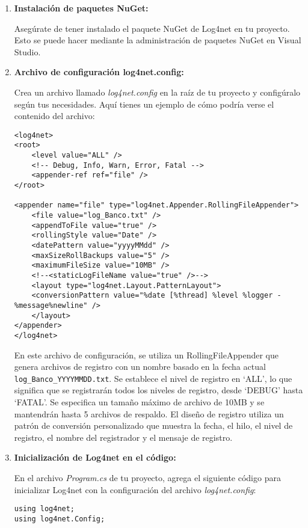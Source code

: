 \documentclass[executivepaper]{article}
\begin{document}
\begin{enumerate}
  \item \textbf{Instalación de paquetes NuGet:}
  
  Asegúrate de tener instalado el paquete NuGet de Log4net en tu proyecto. Esto se puede hacer mediante la administración de paquetes NuGet en Visual Studio.
  
  \item \textbf{Archivo de configuración log4net.config:}
  
  Crea un archivo llamado \emph{log4net.config} en la raíz de tu proyecto y configúralo según tus necesidades. Aquí tienes un ejemplo de cómo podría verse el contenido del archivo:
  
 \begin{lstlisting}
<log4net>
<root>
    <level value="ALL" />
    <!-- Debug, Info, Warn, Error, Fatal -->
    <appender-ref ref="file" />
</root>

<appender name="file" type="log4net.Appender.RollingFileAppender">
    <file value="log_Banco.txt" />
    <appendToFile value="true" />
    <rollingStyle value="Date" />
    <datePattern value="yyyyMMdd" />
    <maxSizeRollBackups value="5" />
    <maximumFileSize value="10MB" />
    <!--<staticLogFileName value="true" />-->
    <layout type="log4net.Layout.PatternLayout">
    <conversionPattern value="%date [%thread] %level %logger - %message%newline" />
    </layout>
</appender>
</log4net>
\end{lstlisting}
En este archivo de configuración, se utiliza un RollingFileAppender que genera archivos de registro con un nombre basado en la fecha actual \lstinline{log_Banco_YYYYMMDD.txt}. Se establece el nivel de registro en \enquote*{ALL}, lo que significa que se registrarán todos los niveles de registro, desde \enquote*{DEBUG} hasta \enquote*{FATAL}. Se especifica un tamaño máximo de archivo de 10MB y se mantendrán hasta 5 archivos de respaldo. El diseño de registro utiliza un patrón de conversión personalizado que muestra la fecha, el hilo, el nivel de registro, el nombre del registrador y el mensaje de registro.

\item \textbf{Inicialización de Log4net en el código:}
  
  En el archivo \emph{Program.cs} de tu proyecto, agrega el siguiente código para inicializar Log4net con la configuración del archivo \emph{log4net.config}:
  
\begin{lstlisting}
using log4net;
using log4net.Config;


\end{lstlisting}
\end{enumerate}
\end{document}
